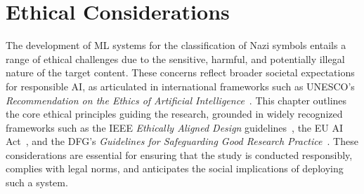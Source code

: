 
\chapter{Ethical Considerations}\label{chapter:ethical-considerations}

The development of \ac{ML} systems for the classification of Nazi symbols entails a range of ethical
challenges due to the sensitive, harmful, and potentially illegal nature of the target content. These concerns
reflect broader societal expectations for responsible AI, as articulated in international frameworks such as \ac{UNESCO}’s
\textit{Recommendation on the Ethics of Artificial Intelligence}~\parencite{unesco2021}. This chapter
outlines the core ethical principles guiding the research, grounded in widely recognized frameworks such as the \ac{IEEE}
\textit{Ethically Aligned Design} guidelines~\parencite{ieee2021ethics}, the EU AI Act~\parencite{euai2023}, and the
\ac{DFG}’s \textit{Guidelines for Safeguarding Good Research Practice}~\parencite{dfg2022}. These considerations are
essential for ensuring that the study is conducted responsibly, complies with legal norms, and anticipates the
social implications of deploying such a system.

